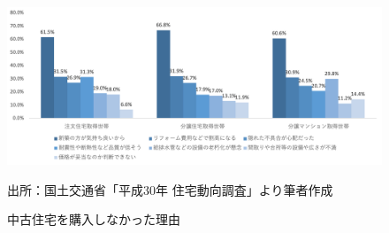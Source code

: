 \documentclass[a4paper,fontsize=11pt,report,notitlepage,line_length=38zw,number_of_lines=40,dvipdfmx]{jlreq}
\begin{document}
\begin{figure}
 \centering
 \includegraphics[width=12cm]{reason.png}
 \caption{中古住宅を購入しなかった理由}
 出所：国土交通省「平成30年 住宅動向調査」より筆者作成
 \label{reason}
\end{figure}


\end{document}
